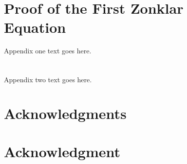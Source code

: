 \documentclass[10pt,journal,compsoc]{IEEEtran}
\begin{document}







%


\appendices
\section{Proof of the First Zonklar Equation}
Appendix one text goes here.

\section{}
Appendix two text goes here.


\ifCLASSOPTIONcompsoc
  \section*{Acknowledgments}
\else
  \section*{Acknowledgment}
\fi
\end{document}
